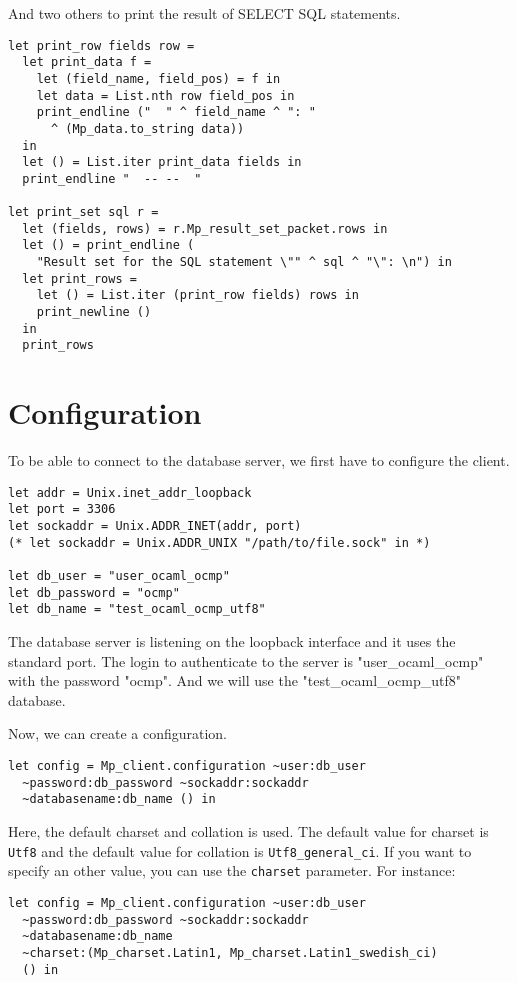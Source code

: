 \documentclass[a4paper, english, 11pt]{article}
\begin{document}
And two others to print the result of SELECT SQL statements.

\begin{verbatim}
let print_row fields row = 
  let print_data f = 
    let (field_name, field_pos) = f in
    let data = List.nth row field_pos in
    print_endline ("  " ^ field_name ^ ": "
      ^ (Mp_data.to_string data))
  in
  let () = List.iter print_data fields in
  print_endline "  -- --  "

let print_set sql r = 
  let (fields, rows) = r.Mp_result_set_packet.rows in
  let () = print_endline (
    "Result set for the SQL statement \"" ^ sql ^ "\": \n") in
  let print_rows =   
    let () = List.iter (print_row fields) rows in
    print_newline ()
  in
  print_rows
\end{verbatim}

\section{Configuration}

To be able to connect to the database server, we first have to configure the client.

\begin{verbatim}
let addr = Unix.inet_addr_loopback
let port = 3306
let sockaddr = Unix.ADDR_INET(addr, port)
(* let sockaddr = Unix.ADDR_UNIX "/path/to/file.sock" in *)

let db_user = "user_ocaml_ocmp"
let db_password = "ocmp"
let db_name = "test_ocaml_ocmp_utf8"
\end{verbatim}

The database server is listening on the loopback interface and it uses the standard port. The login to authenticate to the server is "user\_ocaml\_ocmp" with the password "ocmp". And we will use the "test\_ocaml\_ocmp\_utf8" database.

Now, we can create a configuration.

\begin{verbatim}
let config = Mp_client.configuration ~user:db_user
  ~password:db_password ~sockaddr:sockaddr 
  ~databasename:db_name () in
\end{verbatim}

Here, the default charset and collation is used. The default value for charset is \texttt{Utf8} and the default value for collation is \texttt{Utf8\_general\_ci}. If you want to specify an other value, you can use the \texttt{charset} parameter. For instance:
\begin{verbatim}
let config = Mp_client.configuration ~user:db_user 
  ~password:db_password ~sockaddr:sockaddr 
  ~databasename:db_name 
  ~charset:(Mp_charset.Latin1, Mp_charset.Latin1_swedish_ci)
  () in
\end{verbatim}
\end{document}
